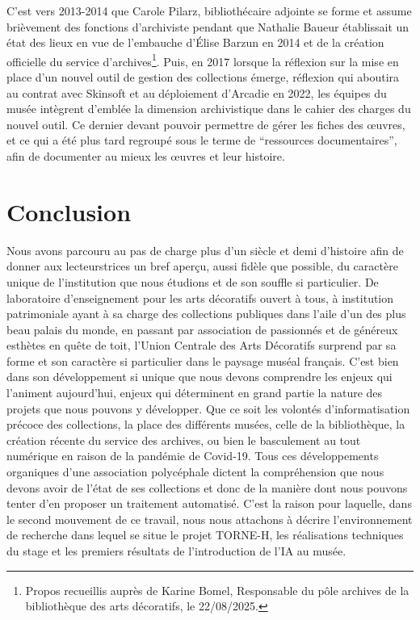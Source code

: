 C'est vers 2013-2014 que Carole Pilarz, bibliothécaire adjointe se forme et assume brièvement des fonctions d'archiviste pendant que Nathalie Baueur établissait un état des lieux en vue de l'embauche d'Élise Barzun en 2014 et de la création officielle du service d'archives\footnote{Propos recueillis auprès de Karine Bomel, Responsable du pôle archives de la bibliothèque des arts décoratifs, le 22/08/2025.}. Puis, en 2017 lorsque la réflexion sur la mise en place d'un nouvel outil de gestion des collections émerge, réflexion qui aboutira au contrat avec Skinsoft et au déploiement d'Arcadie en 2022, les équipes du musée intègrent d'emblée la dimension archivistique dans le cahier des charges du nouvel outil. Ce dernier devant pouvoir permettre de gérer les fiches des œuvres, et ce qui a été plus tard regroupé sous le terme de \enquote{ressources documentaires}, afin de documenter au mieux les œuvres et leur histoire.

\chapter*{Conclusion}

Nous avons parcouru au pas de charge plus d'un siècle et demi d'histoire afin de donner aux lecteurs\wokisme trices un bref aperçu, aussi fidèle que possible, du caractère unique de l'institution que nous étudions et de son souffle si particulier. De laboratoire d'enseignement pour les arts décoratifs ouvert à tous, à institution patrimoniale ayant à sa charge des collections publiques dans l'aile d'un des plus beau palais du monde, en passant par association de passionnés et de généreux esthètes en quête de toit, l'Union Centrale des Arts Décoratifs surprend par sa forme et son caractère si particulier dans le paysage muséal français. C'est bien dans son développement si unique que nous devons comprendre les enjeux qui l'animent aujourd'hui, enjeux qui déterminent en grand partie la nature des projets que nous pouvons y développer. Que ce soit les volontés d'informatisation précoce des collections, la place des différents musées, celle de la bibliothèque, la création récente du service des archives, ou bien le basculement au tout numérique en raison de la pandémie de Covid-19. Tous ces développements organiques d'une association polycéphale dictent la compréhension que nous devons avoir de l'état de ses collections et donc de la manière dont nous pouvons tenter d'en proposer un traitement automatisé. C'est la raison pour laquelle, dans le second mouvement de ce travail, nous nous attachons à décrire l'environnement de recherche dans lequel se situe le projet TORNE-H, les réalisations techniques du stage et les premiers résultats de l'introduction de l'IA au musée.
